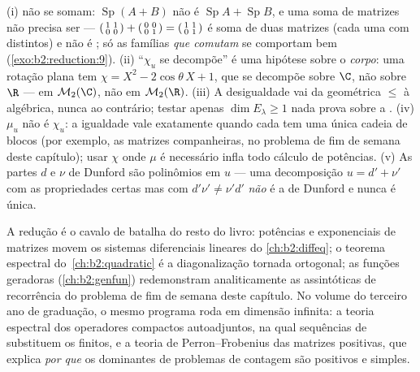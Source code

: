 \begin{remark}\label{rem:b2:reduction:pitfalls}
(i)  não se somam: $\operatorname{Sp}(A + B)$ não é
$\operatorname{Sp}A + \operatorname{Sp}B$, e uma soma de matrizes
 não precisa ser  ---
$\begin{psmallmatrix}1 & 1\\ 0 & 0\end{psmallmatrix} +
\begin{psmallmatrix}0 & 0\\ 0 & 1\end{psmallmatrix} =
\begin{psmallmatrix}1 & 1\\ 0 & 1\end{psmallmatrix}$ é soma de
duas matrizes  (cada uma com  distintos) e
não é ; só as famílias \emph{que comutam} se comportam bem
(\cref{exo:b2:reduction:9}). (ii) ``$\chi_u$ se decompõe'' é uma
hipótese sobre o \emph{corpo}: uma rotação plana tem $\chi =
X^2 - 2\cos\theta\,X + 1$, que se decompõe sobre $\C$, não sobre $\R$ ---
 em $\mathcal{M}_2(\C)$, não  em
$\mathcal{M}_2(\R)$. (iii) A desigualdade vai da geométrica $\leq$
à algébrica, nunca ao contrário; testar apenas $\dim E_\lambda \geq
1$ nada prova sobre a . (iv) $\mu_u$ não é
$\chi_u$: a igualdade vale exatamente quando cada  tem uma
única cadeia de blocos (por exemplo, as matrizes companheiras, no
problema de fim de semana deste capítulo); usar $\chi$ onde $\mu$ é necessário infla
todo cálculo de potências. (v) As partes $d$ e $\nu$ de Dunford são
polinômios em $u$ --- uma decomposição $u = d' + \nu'$ com as
propriedades certas mas com $d'\nu' \neq \nu'd'$ \emph{não} é a de Dunford
e nunca é única.
\end{remark}

\begin{remark}
A redução é o cavalo de batalha do resto do livro: potências e
exponenciais de matrizes movem os sistemas diferenciais lineares do
\cref{ch:b2:diffeq}; o teorema espectral do~\cref{ch:b2:quadratic}
é a diagonalização tornada ortogonal; as funções geradoras
(\cref{ch:b2:genfun}) redemonstram analiticamente as assintóticas de recorrência do
problema de fim de semana deste capítulo. No volume do terceiro ano de graduação, o
mesmo programa roda em dimensão infinita: a teoria espectral dos
operadores compactos autoadjuntos, na qual sequências de  substituem
os  finitos, e a teoria de Perron--Frobenius das matrizes
positivas, que explica \emph{por que} os  dominantes de
problemas de contagem são positivos e simples.
\end{remark}

